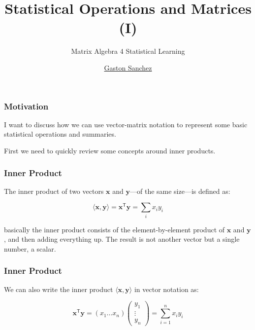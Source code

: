 \documentclass[12pt]{beamer}\usepackage[]{graphicx}\usepackage[]{color}
\title{Statistical Operations and Matrices (I)}
\subtitle{Matrix Algebra 4 Statistical Learning}
\author{\href{http://www.gastonsanchez.com}{Gaston Sanchez}}
\institute{\href{https://creativecommons.org/licenses/by-sa/4.0/}{\tt \scriptsize \color{foreground} CC BY-SA 4.0}}
\date{}
\begin{document}
{
  \frame{\titlepage} 
}


\begin{frame}
\begin{center}
\Huge{}
\end{center}
\end{frame}


\begin{frame}
\frametitle{Motivation}

I want to discuss how we can use vector-matrix notation to represent
some basic statistical operations and summaries.

\bigskip
First we need to quickly review some concepts around inner products.

\end{frame}


\begin{frame}
\frametitle{Inner Product}

The inner product of two vectors $\mathbf{x}$ and $\mathbf{y}$---of the same size---is defined as:

{\Large
$$
\langle \mathbf{x}, \mathbf{y} \rangle = \mathbf{x^{\mathsf{T}} y} = \sum_i x_i y_i
$$
}

basically the inner product consists of the element-by-element product of 
$\mathbf{x}$ and $\mathbf{y}$, and then adding everything up. The result is not 
another vector but a single number, a scalar. 

\end{frame}


\begin{frame}
\frametitle{Inner Product}

We can also write the inner product $\langle \mathbf{x}, \mathbf{y} \rangle$ in 
vector notation as:

$$
\mathbf{x^\mathsf{T} y} = (x_1 \dots x_n) 
\begin{pmatrix} 
y_1 \\
\vdots \\
y_n
\end{pmatrix}
= \sum_{i = 1}^{n} x_i y_i
$$

\end{frame}
\end{document}
